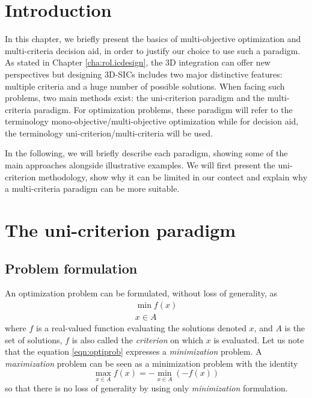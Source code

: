 \label{cha:rol.mcda}

\begin{summary}
\lipsum[1]
\end{summary}

\section{Introduction}
\label{sec:rol2.intro}
In this chapter, we briefly present the basics of multi-objective optimization and multi-criteria decision aid, in order to justify our choice to use such a paradigm. As stated in Chapter \ref{cha:rol.icdesign}, the 3D integration can offer new perspectives but designing 3D-SICs includes two major distinctive features: multiple criteria and a huge number of possible solutions. When facing such problems, two main methods exist: the uni-criterion paradigm and the multi-criteria paradigm. For optimization problems, these paradigm will refer to the terminology mono-objective/multi-objective optimization while for decision aid, the terminology uni-criterion/multi-criteria will be used.

In the following, we will briefly describe each paradigm, showing some of the main approaches alongside illustrative examples. We will first present the uni-criterion methodology, show why it can be limited in our contect and explain why a multi-criteria paradigm can be more suitable.

\section{The uni-criterion paradigm}
\label{sec:rol2.unicrit_paradigm}

\subsection{Problem formulation}
An optimization problem can be formulated, without loss of generality, as \cite{BraMar2002}
\begin{equation}
\label{eqn:optiprob}
\begin{gathered}
\min f(x)\\
x \in A
\end{gathered}
\end{equation}
where $f$ is a real-valued function evaluating the solutions denoted $x$, and $A$ is the set of solutions, $f$ is also called the \emph{criterion} on which $x$ is evaluated. Let us note that the equation \ref{eqn:optiprob} expresses a \emph{minimization} problem. A \emph{maximization} problem can be seen as a minimization problem with the identity
$$
\max_{x \in A} f(x) = - \min_{x \in A} (-f(x))
$$
so that there is no loss of generality by using only \emph{minimization} formulation.

